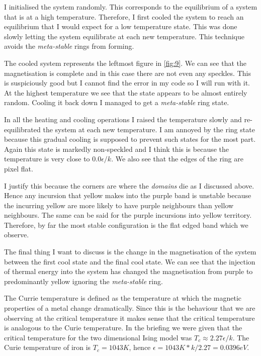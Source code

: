 \documentclass[a4paper, twocolumn]{article}
\begin{document}
I initialised the system randomly. This corresponds to the %
equilibrium of a system that is at a high temperature. %
Therefore, I first cooled the system to reach an equilibrium %
that I would expect for a low temperature state. This was done %
slowly letting the system equilibrate at each new temperature. %
This technique avoids the \emph{meta-stable} rings from forming. 


The cooled system represents the leftmost figure in \ref{fig:9}. %
We can see that the magnetisation is complete and in this case %
there are not even any speckles. This is suspiciously good but %
I cannot find the error in my code so I will run with it. At %
the highest temperature we see that the state appears to be %
almost entirely random. Cooling it back down I managed to get %
a \emph{meta-stable} ring state.


In all the heating and cooling operations I raised the temperature %
slowly and re-equilibrated the system at each new temperature. %
I am annoyed by the ring state because this gradual cooling is %
supposed to prevent such states for the most part. Again this %
state is markedly non-speckled and I think this is because the %
temperature is very close to \(0.0 \epsilon / k\). We also see %
that the edges of the ring are pixel flat. 


I justify this because the corners are where the \emph{domains} %
die as I discussed above. Hence any incursion that yellow makes %
into the purple band is unstable because the incurring yellow %
are more likely to have purple neighbours than yellow neighbours. %
The same can be said for the purple incursions into yellow %
territory. Therefore, by far the most stable configuration is %
the flat edged band which we observe. 


The final thing I want to discuss is the change in the magnetisation %
of the system between the first cool state and the final cool state. %
We can see that the injection of thermal energy into the system %
has changed the magnetisation from purple to predominantly yellow %
ignoring the \emph{meta-stable} ring. 


The Currie temperature is defined as the temperature at which the %
magnetic properties of a metal change dramatically. Since this is %
the behaviour that we are observing at the critical temperature %
it makes sense that the critical temperature is analogous to the %
Curie temperature. In the briefing %
we were given that the critical temperature for the two dimensional %
Ising model was \(T_{c} \approx 2.27\epsilon / k\). The Curie %
temperature of iron is \(T_{c} = 1043K\), hence \(\epsilon = %
1043K * k / 2.27 = 0.0396eV\). 
\vfill
\end{document}
